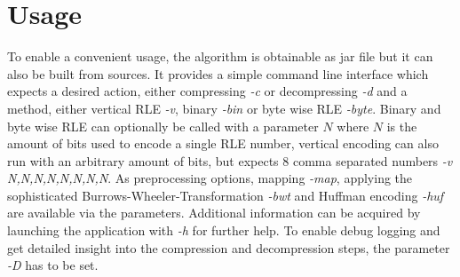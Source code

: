 \section{Usage}
\label{ch:Implementation:sec:usage}
\par{
To enable a convenient usage, the algorithm is obtainable as jar file but it can also be built from sources. It provides a simple command line interface which expects a desired action, either compressing \emph{-c} or decompressing \emph{-d} and a method, either vertical RLE \emph{-v}, binary \emph{-bin} or byte wise RLE \emph{-byte}. Binary and byte wise RLE can optionally be called with a parameter $N$ where $N$ is the amount of bits used to encode a single RLE number, vertical encoding can also run with an arbitrary amount of bits, but expects 8 comma separated numbers \emph{-v N,N,N,N,N,N,N,N}. As preprocessing options, mapping \emph{-map}, applying the sophisticated Burrows-Wheeler-Transformation \emph{-bwt} and Huffman encoding \emph{-huf} are available via the parameters. Additional information can be acquired by launching the application with \emph{-h} for further help. To enable debug logging and get detailed insight into the compression and decompression steps, the parameter \emph{-D} has to be set.
}

